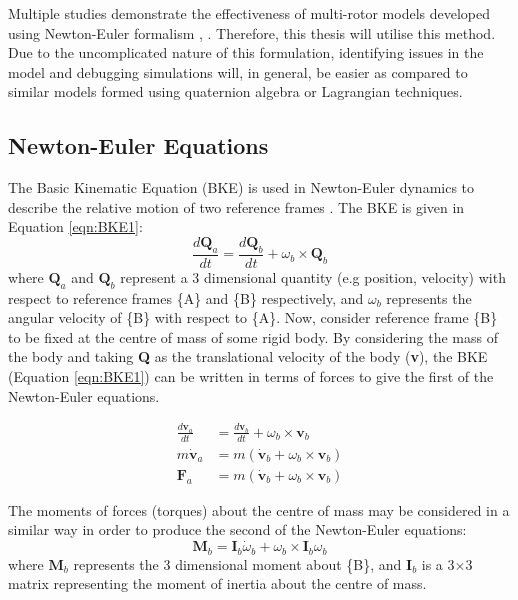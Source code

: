 Multiple studies demonstrate the effectiveness of multi-rotor models developed using Newton-Euler formalism \cite{Bouabdallah2006}, \cite{Baranek2012}. Therefore, this thesis will utilise this method. Due to the uncomplicated nature of this formulation, identifying issues in the model and debugging simulations will, in general, be easier as compared to similar models formed using quaternion algebra or Lagrangian techniques.



\subsection{Newton-Euler Equations}
The Basic Kinematic Equation (BKE) is used in Newton-Euler dynamics to describe the relative motion of two reference frames \cite{Ardema2006}. The BKE is given in Equation \ref{eqn:BKE1}:
\begin{equation}\label{eqn:BKE1} 
\frac{d\textbf{Q}_{a}}{dt}=\frac{d\textbf{Q}_{b}}{dt}+\omega_{b} \times \textbf{Q}_{b}
\end{equation}
where $\textbf{Q}_{a}$ and $\textbf{Q}_{b}$ represent a 3 dimensional quantity (e.g position, velocity) with respect to reference frames \{A\} and \{B\} respectively, and $\omega_{b}$ represents the angular velocity of \{B\} with respect to \{A\}. Now, consider reference frame \{B\} to be fixed at the centre of mass of some rigid body. By considering the mass of the body and taking \textbf{Q} as the translational velocity of the body (\textbf{v}), the BKE (Equation \ref{eqn:BKE1}) can be written in terms of forces to give the first of the Newton-Euler equations.

\begin{equation}\label{eqn:BKE2}
\begin{split} 
\frac{d\textbf{v}_{a}}{dt}&=\frac{d\textbf{v}_{b}}{dt}+\omega_{b} \times \textbf{v}_{b}\\
m\dot{\textbf{v}}_{a}&=m(\dot{\textbf{v}}_{b}+\omega_{b} \times \textbf{v}_{b})\\
\textbf{F}_{a}&=m(\dot{\textbf{v}}_{b}+\omega_{b}\times\textbf{v}_{b})
\end{split}
\end{equation}

The moments of forces (torques) about the centre of mass may be considered in a similar way in order to produce the second of the Newton-Euler equations\cite{Ardema2006}:
\begin{equation}\label{eqn:Euler2}
\textbf{M}_{b}=\textbf{I}_{b}\dot{\omega}_{b}+\omega_{b}\times\textbf{I}_{b}\omega_{b}
\end{equation}
where $\textbf{M}_{b}$ represents the 3 dimensional moment about \{B\}, and $\textbf{I}_{b}$ is a 3$\times$3 matrix representing the moment of inertia about the centre of mass.

